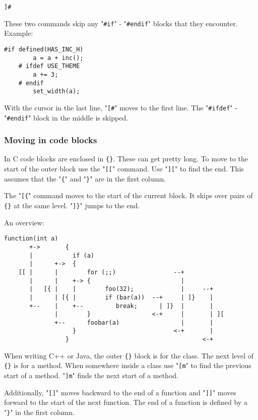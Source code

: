 \begin{Verbatim}[samepage=true]
 ]#
\end{Verbatim}

These two commands skip any "\texttt{\#if}" - "\texttt{\#endif}" blocks that they encounter.
Example:

\begin{Verbatim}[samepage=true]
    #if defined(HAS_INC_H) 
        a = a + inc(); 
    # ifdef USE_THEME 
        a += 3; 
    # endif 
        set_width(a); 
\end{Verbatim}

With the cursor in the last line, "\texttt{[\#}" moves to the first line.
The "\texttt{\#ifdef}" - "\texttt{\#endif}" block in the middle is skipped.
\subsubsection{Moving in code blocks}
In C code blocks are enclosed in \texttt{\{\}}.
These can get pretty long.
To move to the start of the outer block use the "\texttt{[[}" command.
Use "\texttt{][}" to find the end.
This assumes that the "\texttt{\{}" and "\texttt{\}}" are in the first column.

The "\texttt{[\{}" command moves to the start of the current block.
It skips over pairs of \texttt{\{\}} at the same level.
"\texttt{]\}}" jumps to the end.

An overview:

\begin{Verbatim}[samepage=true]
                 function(int a)
       +->       {
       |           if (a)
       |      +->  {
    [[ |      |        for (;;)                --+
       |      |    +-> {                         |
       |   [{ |    |        foo(32);             |     --+
       |      | [{ |        if (bar(a))  --+     | ]}    |
       +--    |    +--         break;      | ]}  |       |
              |        }                 <-+     |       | ][
              +--      foobar(a)                 |       |
                   }                           <-+       |
                 }                                     <-+
\end{Verbatim}

When writing C++ or Java, the outer \texttt{\{\}} block is for the class.
The next level of \texttt{\{\}} is for a method.
When somewhere inside a class use "\texttt{[m}" to find the previous start of a method.
"\texttt{]m}" finds the next start of a method.

Additionally, "\texttt{[]}" moves backward to the end of a function and "\texttt{]]}" moves forward to the start of the next function.
The end of a function is defined by a "\texttt{\}}" in the first column.

